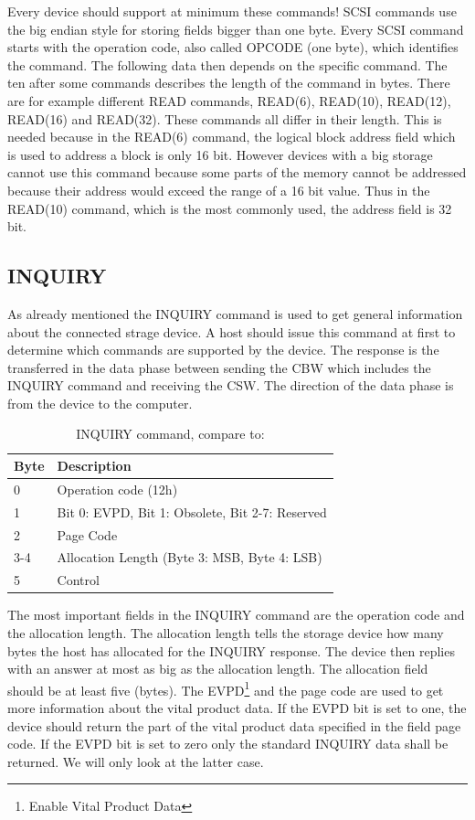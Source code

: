 Every device should support at minimum these commands! SCSI commands use the big endian style for storing fields bigger than one byte. Every SCSI command starts with the operation code, also called OPCODE (one byte), which identifies the command. The following data then depends on the specific command. The ten after some commands describes the length of the command in bytes. There are for example different READ commands, READ(6), READ(10), READ(12), READ(16) and READ(32)\cite{scsi_seagate}. These commands all differ in their length. This is needed because in the READ(6) command, the logical block address field which is used to address a block is only 16 bit. However devices with a big storage cannot use this command because some parts of the memory cannot be addressed because their address would exceed the range of a 16 bit value. Thus in the READ(10) command, which is the most commonly used, the address field is 32 bit.

\subsection{INQUIRY}

As already mentioned the INQUIRY command is used to get general information about the connected strage device. A host should issue this command at first to determine which commands are supported by the device. The response is the transferred in the data phase between sending the CBW which includes the INQUIRY command and receiving the CSW. The direction of the data phase is from the device to the computer.

\begin{table}[ht]
\caption{INQUIRY command, compare to: \cite{scsi_seagate}}
\centering
\begin{tabular}{|l|l|}
\hline\hline
\textbf{Byte} & \textbf{Description}\\ \hline
0 & Operation code (12h) \\ \hline
1 & Bit 0: EVPD, Bit 1: Obsolete, Bit 2-7: Reserved\\ \hline
2 & Page Code \\ \hline
3-4 & Allocation Length (Byte 3: MSB, Byte 4: LSB) \\ \hline
5 & Control \\ \hline
\end{tabular}
\label{table:inquiry}
\end{table}

The most important fields in the INQUIRY command are the operation code and the allocation length. The allocation length tells the storage device how many bytes the host has allocated for the INQUIRY response. The device then replies with an answer at most as big as the allocation length. The allocation field should be at least five (bytes). The EVPD\footnote{Enable Vital Product Data} and the page code are used to get more information about the vital product data. If the EVPD bit is set to one, the device should return the part of the vital product data specified in the field page code. If the EVPD bit is set to zero only the standard INQUIRY data shall be returned\cite{scsi_seagate}. We will only look at the latter case.

